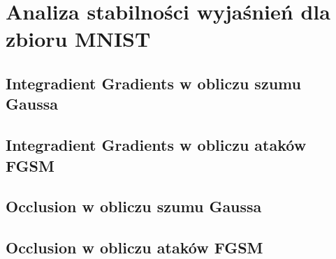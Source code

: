 \chapter{Analiza stabilności wyjaśnień dla zbioru MNIST}

\section{Integradient Gradients w obliczu szumu Gaussa}
\section{Integradient Gradients w obliczu ataków FGSM}
\section{Occlusion w obliczu szumu Gaussa}
\section{Occlusion w obliczu ataków FGSM}
